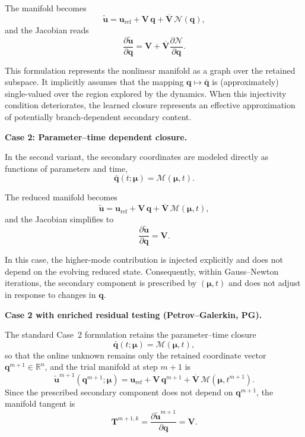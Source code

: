 \documentclass[11pt]{article}
\begin{document}
The manifold becomes
\begin{equation}
\tilde{\mathbf u}
=
\mathbf u_{\mathrm{ref}}
+
\mathbf V\,\mathbf q
+
\overline{\mathbf V}\,
\mathcal N(\mathbf q),
\end{equation}
and the Jacobian reads
\[
\frac{\partial \tilde{\mathbf u}}{\partial \mathbf q}
=
\mathbf V
+
\overline{\mathbf V}
\frac{\partial \mathcal N}{\partial \mathbf q}.
\]

This formulation represents the nonlinear manifold as a graph over the retained subspace. It implicitly assumes that the mapping $\mathbf q \mapsto \bar{\mathbf q}$ is (approximately) single-valued over the region explored by the dynamics. When this injectivity condition deteriorates, the learned closure represents an effective approximation of potentially branch-dependent secondary content.

\medskip
\noindent
\textbf{Case 2: Parameter--time dependent closure.}

In the second variant, the secondary coordinates are modeled directly as functions of parameters and time,
\begin{equation}
\bar{\mathbf q}(t;\bm\mu)
=
\mathcal M(\bm\mu,t).
\end{equation}

The reduced manifold becomes
\begin{equation}
\tilde{\mathbf u}
=
\mathbf u_{\mathrm{ref}}
+
\mathbf V\,\mathbf q
+
\overline{\mathbf V}\,
\mathcal M(\bm\mu,t),
\end{equation}
and the Jacobian simplifies to
\[
\frac{\partial \tilde{\mathbf u}}{\partial \mathbf q}
=
\mathbf V.
\]

In this case, the higher-mode contribution is injected explicitly and does not depend on the evolving reduced state. 
Consequently, within Gauss--Newton iterations, the secondary component is prescribed by $(\bm\mu,t)$ and does not adjust in response to changes in $\mathbf q$.

\medskip
\noindent
\textbf{Case 2 with enriched residual testing (Petrov--Galerkin, PG).}

The standard Case~2 formulation retains the parameter--time closure
\[
\bar{\mathbf q}(t;\bm\mu)=\mathcal M(\bm\mu,t),
\]
so that the online unknown remains only the retained coordinate vector
\(\mathbf q^{m+1}\in\mathbb R^n\), and the trial manifold at step \(m{+}1\) is
\begin{equation}
\tilde{\mathbf u}^{m+1}(\mathbf q^{m+1};\bm\mu)
=
\mathbf u_{\mathrm{ref}}
+
\mathbf V\,\mathbf q^{m+1}
+
\overline{\mathbf V}\,\mathcal M(\bm\mu,t^{m+1}).
\label{eq:case2_enriched_manifold_short}
\end{equation}
Since the prescribed secondary component does not depend on \(\mathbf q^{m+1}\),
the manifold tangent is
\[
\mathbf T^{m+1,k}=\frac{\partial \tilde{\mathbf u}^{m+1}}{\partial \mathbf q}
=\mathbf V.
\]
\end{document}

